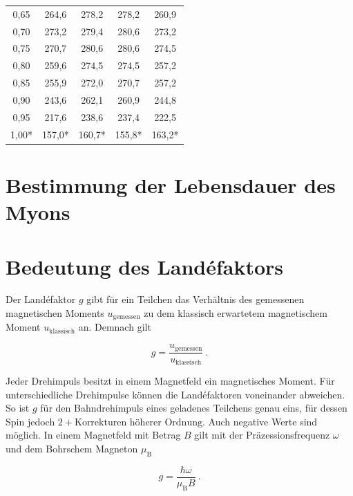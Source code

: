 \documentclass[a4paper,ngerman]{scrartcl}
\begin{document}
\begin{table}[tb!]
\begin{tabular}{ccccc}
0,65 & 264,6 & 278,2 & 278,2 & 260,9 \\
0,70 & 273,2 & 279,4 & 280,6 & 273,2 \\
0,75 & 270,7 & 280,6 & 280,6 & 274,5 \\
0,80 & 259,6 & 274,5 & 274,5 & 257,2 \\
0,85 & 255,9 & 272,0 & 270,7 & 257,2 \\
0,90 & 243,6 & 262,1 & 260,9 & 244,8 \\
0,95 & 217,6 & 238,6 & 237,4 & 222,5 \\
1,00* & 157,0* & 160,7* & 155,8* & 163,2* \\
\bottomrule
\end{tabular}
\label{tab:fieldinhomogenities}
\end{table}








\section{Bestimmung der Lebensdauer des Myons}









\section{Bedeutung des Landéfaktors}

Der Landéfaktor $g$ gibt für ein Teilchen das Verhältnis des gemessenen magnetischen Moments $ u_{\mathrm{gemessen}}$ zu dem klassisch erwartetem magnetischem Moment $u_{\mathrm{klassisch}}$ an. Demnach gilt

\begin{equation}
g = \frac{ u_{\mathrm{gemessen}} }{u_{\mathrm{klassisch}} } ~.
\end{equation}

Jeder Drehimpuls besitzt in einem Magnetfeld ein magnetisches Moment. Für unterschiedliche Drehimpulse können die Landéfaktoren voneinander abweichen. So ist $g$ für den Bahndrehimpuls eines geladenes Teilchens genau eins, für dessen Spin jedoch $2 + \text{Korrekturen höherer Ordnung}$. Auch negative Werte sind möglich. In einem Magnetfeld mit Betrag $B$ gilt mit der Präzessionsfrequenz $\omega$ und dem Bohrschem Magneton $\mu_\mathrm{B}$

\begin{equation}
g = \frac{\hbar \omega}{\mu_\mathrm{B} B} ~.
\end{equation}
\end{document}

